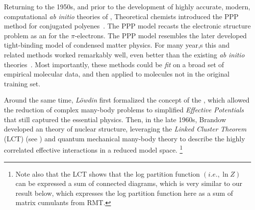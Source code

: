 Returning to the 1950s, and prior to the development of highly accurate, modern,
computational \emph{ab initio} theories of \QuantumChemistry, %
Theoretical chemists introduced the \SemiEmpirical PPP method
for
conjugated polyenes~\cite{PariserParr53}.
The PPP model recasts the electronic structure problem as an \emph{\EffectiveHamiltonian}
for the $\pi$-electrons.
The PPP model resembles the later developed tight-binding model of condensed matter physics\cite{Hubbard1963}.
For many year,s this and related \SemiEmpirical methods
worked remarkably well, even better than the existing \emph{ab initio}
theories~\cite{Dewar1975,Ridley1973,Stewart1990,Warshel1976,THIEL2005559}.
Most importantly, these methods could be \emph{fit}
on a broad set of empirical molecular data, and then applied to molecules not in the original training set.

Around the same time, \emph{Löwdin} first formalized the concept of the \EffectiveHamiltonian,
which allowed the reduction of complex many-body problems to simplified
\emph{Effective Potentials} that still captured the essential physics.
Then, in the late 1960s, Brandow 
developed an \EffectiveHamiltonian theory of
nuclear structure, 
leveraging the \emph{Linked Cluster Theorem} (LCT) (see \cite{Hubbard1959}) and quantum mechanical many-body theory
to describe the highly correlated effective interactions in a reduced model space.
\footnote{Note also that the LCT shows that the log partition function $(i.e., \ln Z)$ can be expressed
a sum of connected diagrams, which is very similar to our result below, which expresses the
log partition function here as a sum of matrix cumulants from RMT.}


